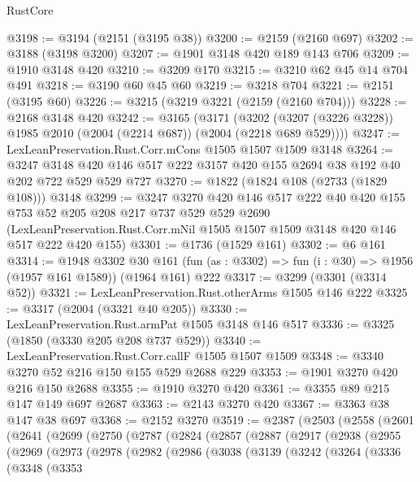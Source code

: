 \begin{lexlean}{RustCore}
\begin{coremodule}
@3198 := @3194 (@2151 (@3195 @38))
@3200 := @2159 (@2160 @697)
@3202 := @3188 (@3198 @3200)
@3207 := @1901 @3148 @420 @189 @143 @706
@3209 := @1910 @3148 @420
@3210 := @3209 @170
@3215 := @3210 @62 @45 @14 @704 @491
@3218 := @3190 @60 @45 @60
@3219 := @3218 @704
@3221 := @2151 (@3195 @60)
@3226 := @3215 (@3219 @3221 (@2159 (@2160 @704)))
@3228 := @2168 @3148 @420
@3242 := @3165
    (@3171 (@3202 (@3207 (@3226 @3228)) @1985 @2010 (@2004 (@2214 @687)) (@2004 (@2218 @689 @529))))
@3247 := LexLeanPreservation.Rust.Corr.mCons @1505 @1507 @1509 @3148
@3264 := @3247 @3148 @420 @146 @517 @222 @3157 @420 @155 @2694 @38 @192 @40 @202 @722 @529 @529 @727
@3270 := @1822 (@1824 @108 (@2733 (@1829 @108))) @3148
@3299 := @3247
    @3270
    @420
    @146
    @517
    @222
    @40
    @420
    @155
    @753
    @52
    @205
    @208
    @217
    @737
    @529
    @529
    @2690
    (LexLeanPreservation.Rust.Corr.mNil @1505 @1507 @1509 @3148 @420 @146 @517 @222 @420 @155)
@3301 := @1736 (@1529 @161)
@3302 := @6 @161
@3314 := @1948
    @3302
    @30
    @161
    (fun (as : @3302) => fun (i : @30) => @1956 (@1957 @161 @1589))
    (@1964 @161)
    @222
@3317 := @3299 (@3301 (@3314 @52))
@3321 := LexLeanPreservation.Rust.otherArms @1505 @146 @222
@3325 := @3317 (@2004 (@3321 @40 @205))
@3330 := LexLeanPreservation.Rust.armPat @1505 @3148 @146 @517
@3336 := @3325 (@1850 (@3330 @205 @208 @737 @529))
@3340 := LexLeanPreservation.Rust.Corr.callF @1505 @1507 @1509
@3348 := @3340 @3270 @52 @216 @150 @155 @529 @2688 @229
@3353 := @1901 @3270 @420 @216 @150 @2688
@3355 := @1910 @3270 @420
@3361 := @3355 @89 @215 @147 @149 @697 @2687
@3363 := @2143 @3270 @420
@3367 := @3363 @38 @147 @38 @697
@3368 := @2152 @3270
@3519 := @2387
    (@2503
      (@2558
        (@2601
          (@2641
            (@2699
              (@2750
                (@2787
                  (@2824
                    (@2857
                      (@2887
                        (@2917
                          (@2938
                            (@2955
                              (@2969
                                (@2973
                                  (@2978
                                    (@2982
                                      (@2986
                                        (@3038
                                          (@3139
                                            (@3242
                                              (@3264
                                                (@3336
                                                  (@3348
                                                    (@3353

\end{coremodule}
\end{lexlean}
